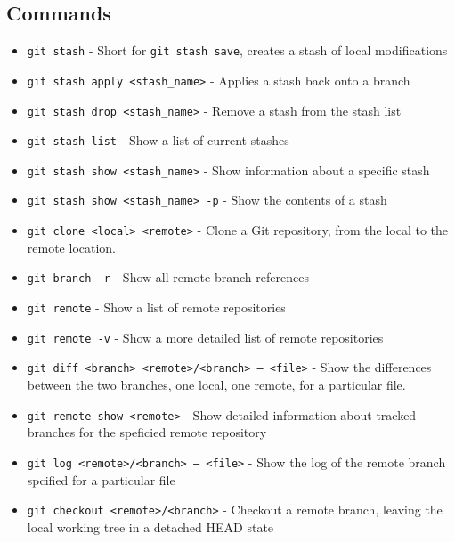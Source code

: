 \subsection{Commands}
\begin{itemize}

\item\texttt{git stash} - Short for \texttt{git stash save}, creates a stash of local modifications

\item\texttt{git stash apply <stash\_name>} - Applies a stash back onto a branch

\item\texttt{git stash drop <stash\_name>} - Remove a stash from the stash list

\item\texttt{git stash list} - Show a list of current stashes

\item\texttt{git stash show <stash\_name>} - Show information about a specific stash

\item\texttt{git stash show <stash\_name> -p} - Show the contents of a stash

\item\texttt{git clone <local> <remote>} - Clone a Git repository, from the local to the remote location.

\item\texttt{git branch -r} - Show all remote branch references

\item\texttt{git remote} - Show a list of remote repositories

\item\texttt{git remote -v} - Show a more detailed list of remote repositories

\item\texttt{git diff <branch> <remote>/<branch> -- <file>} - Show the differences between the two branches, one local, one remote, for a particular file.

\item\texttt{git remote show <remote>} - Show detailed information about tracked branches for the speficied remote repository

\item\texttt{git log <remote>/<branch> -- <file>} - Show the log of the remote branch spcified for a particular file

\item\texttt{git checkout <remote>/<branch>} - Checkout a remote branch, leaving the local working tree in a detached HEAD state


\end{itemize}
